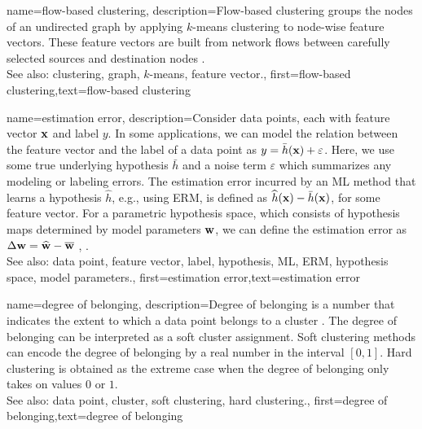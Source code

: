 {name={flow-based clustering},
	description={Flow-based clustering groups the nodes 
		of an undirected graph by applying $k$-means clustering to node-wise 
		feature vectors. These feature vectors are built from network flows between 
		carefully selected sources and destination nodes \cite{FlowSpecClustering2021}. 
					\\ 
		See also: clustering, graph, $k$-means, feature vector.}, 
	first={flow-based clustering},text={flow-based clustering} 
}



{name={estimation error},
	description={Consider data points, each with feature vector ${\bf x}$ and label 
		$y$. In some applications, we can model the relation between the feature vector and the label
		of a data point as $y = \bar{h}({\bf x}) + \varepsilon$. Here, we 
		use some true underlying hypothesis $\bar{h}$ and a noise term $\varepsilon$ 
		which summarizes any modeling or labeling errors. The estimation error incurred by an ML 
		method that learns a hypothesis $\widehat{h}$, e.g., using ERM, is defined as 
		$\widehat{h}({\bf x}) - \bar{h}({\bf x})$, for some feature vector. 
		For a parametric hypothesis space, which consists of hypothesis maps determined by 
		model parameters ${\bf w}$, we can define the estimation error as $\Delta {\bf w} = \widehat{{\bf w}} - \overline{{\bf w}}$ \cite{hastie01statisticallearning}, \cite{kay}.
					\\ 
		See also: data point, feature vector, label, hypothesis, ML, ERM, hypothesis space, model parameters.},
	first={estimation error},text={estimation error} 
}


{name={degree of belonging},
	description={Degree of belonging is a number that indicates the extent to which a data point 
		belongs to a cluster \cite[Ch. 8]{MLBasics}. The degree of belonging can be 
		interpreted as a soft cluster assignment. Soft clustering methods can 
		encode the degree of belonging by a real number in the interval $[0,1]$. 
		Hard clustering is obtained as the extreme case when the degree of belonging 
		only takes on values $0$ or $1$.
					\\ 
		See also: data point, cluster, soft clustering, hard clustering.}, first={degree of belonging},text={degree of belonging} 
}

